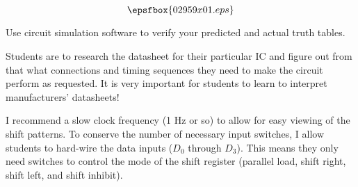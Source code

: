 

$$\epsfbox{02959x01.eps}$$

\vfil \eject






Use circuit simulation software to verify your predicted and actual truth tables.







Students are to research the datasheet for their particular IC and figure out from that what connections and timing sequences they need to make the circuit perform as requested.  It is very important for students to learn to interpret manufacturers' datasheets!

I recommend a slow clock frequency (1 Hz or so) to allow for easy viewing of the shift patterns.  To conserve the number of necessary input switches, I allow students to hard-wire the data inputs ($D_0$ through $D_3$).  This means they only need switches to control the mode of the shift register (parallel load, shift right, shift left, and shift inhibit).




